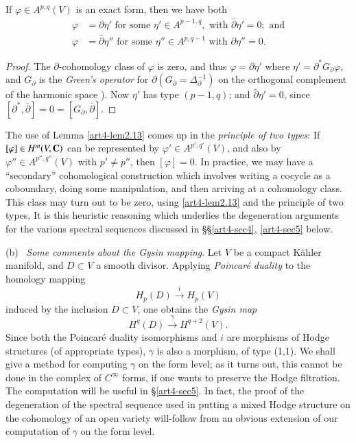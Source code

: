 \begin{lemma}\label{art4-lem2.13}
If $\varphi \in A^{p,q} (V)$ is an exact form, then we have both
\begin{align*}
\varphi & = \partial \eta' \text{ for some } \eta' \in A^{p-1,q}, \text{ with } \bar{\partial} \eta' = 0; \text{ and}\\
\varphi & = \bar{\partial} \eta'' \text{ for some } \eta'' \in A^{p,q-1} \text{ with } \partial \eta'' = 0.
\end{align*} 
\end{lemma}

\begin{proof}
The $\partial$-cohomology class of $\varphi$ is zero, and thus $\varphi = \partial \eta'$ where $\eta' = \partial^\ast G_\partial \varphi$, and $G_\partial$ is the \textit{Green's operator} for $\partial (G_\partial = \Delta^{-1}_{\partial})$ on the orthogonal complement of the harmonic space \cite{art4-key44}). Now $\eta'$ has type $(p-1, q)$; and $\bar{\partial} \eta' = 0$, since $[\partial^{\ast}, \bar{\partial}]  =0=[G_\partial, \bar{\partial}]$.
\end{proof}

The use of Lemma \ref{art4-lem2.13} comes up in the \textit{principle of two types}: If $[\varphi] \in H^m(V, \mathbf{C})$ can be represented by $\varphi' \in A^{p',q'} (V)$, and also by $\varphi'' \in A^{p'', q''} (V)$ with $p' \neq p''$, then $[\varphi] =0$. In practice, we may have a ``secondary'' cohomological construction which involves writing a cocycle as a coboundary, doing some manipulation, and then arriving at a cohomology class. This class may turn out to be zero, using \ref{art4-lem2.13} and the principle of two types, It is this heuristic reasoning which underlies the degeneration arguments for the various spectral sequences discussed in \S \S \ref{art4-sec4}, \ref{art4-sec5} below.

\medskip
\noindent
(b)~ \textit{Some comments about the Gysin mapping}. Let $V$ be a compact K\"{a}hler manifold, and $D \subset V$ a smooth divisor. Applying \textit{Poincar\'e duality} to the homology mapping
$$
H_p (D) \xrightarrow{i} H_p (V)
$$
induced by the inclusion $D \subset V$, one obtains the \textit{Gysin map}
\begin{equation}
H^q (D) \xrightarrow{\gamma} H^{q+2}(V). \label{art4-eq2.14}
\end{equation}\pageoriginale
Since both the Poincar\'e duality isomorphisms and $i$ are morphisms of Hodge structures (of appropriate types), $\gamma$ is also a morphism, of type (1,1). We shall give a method for computing $\gamma$ on the form level; as it turns out, this cannot be done in the complex of $C^\infty$ forms, if one wants to preserve the Hodge filtration. The computation will be useful in \S \ref{art4-sec5}. In fact, the proof of the degeneration of the spectral sequence used in putting a mixed Hodge structure on the cohomology of an open variety will-follow from an obvious extension of our computation of $\gamma$ on the form level.

